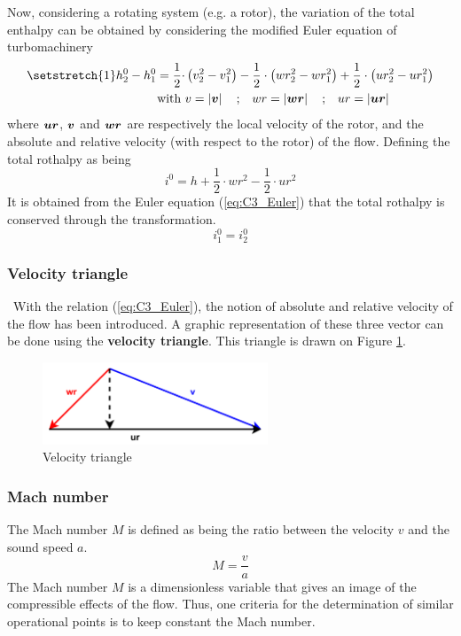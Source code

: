 Now, considering a rotating system (e.g. a rotor), the variation of the total enthalpy can be obtained by considering the modified Euler equation of turbomachinery
\begin{align}
\setstretch{1}
h_2^0 - h_1^0 = \frac{1}{2}\cdot &\left(v_2^2 - v_1^2\right) - \frac{1}{2}\cdot \left(wr_2^2 - wr_1^2\right) + \frac{1}{2}\cdot \left(ur_2^2 - ur_1^2\right)\label{eq:C3_Euler}\\
\text{with }& v = \left|\vect{v}\right|\quad\text{;}\quad  wr = \left|\vect{wr}\right|\quad\text{;}\quad ur= \left|\vect{ur}\right|\nonumber
\end{align}
where $\boldsymbol{ur}$, $\boldsymbol{v}$ and $\boldsymbol{wr}$ are respectively the local velocity of the rotor, and the absolute and relative velocity (with respect to the rotor) of the flow. Defining the total rothalpy as being 
\begin{equation}
i^0 = h + \frac{1}{2}\cdot wr^2 - \frac{1}{2}\cdot ur^2 \label{eq:C3_i0}
\end{equation}
It is obtained from the Euler equation (\ref{eq:C3_Euler}) that the total rothalpy is conserved through the transformation.
\begin{equation}
i_1^0 = i_2^0 \label{eq:C3_icons}
\end{equation}
\subsubsection{Velocity triangle}
\quad\, With the relation (\ref{eq:C3_Euler}), the notion of absolute and relative velocity of the flow has been introduced. A graphic representation of these three vector can be done using the \textbf{velocity triangle}. This triangle is drawn on Figure \ref{fig:C3_vtriang}.
\begin{figure}[h]
\centering
\includegraphics[width=0.6\textwidth]{Vtriangle.png}
\caption{Velocity triangle}
\label{fig:C3_vtriang}
\end{figure}

\subsubsection{Mach number}
The Mach number $M$ is defined as being the ratio between the velocity $v$ and the sound speed $a$.
\begin{equation}
M = \frac{v}{a} \label{eq:C3_Mach}
\end{equation}
The Mach number $M$ is a dimensionless variable that gives an image of the compressible effects of the flow. Thus, one criteria for the determination of similar operational points is to keep constant the Mach number.

